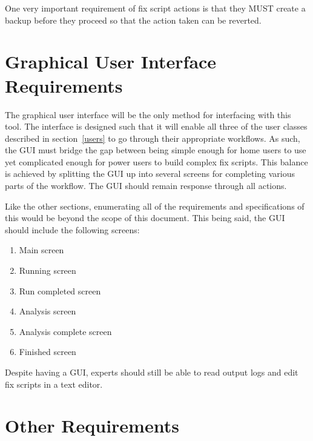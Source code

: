 \documentclass[letterpaper,12pt]{article}
\begin{document}
One very important requirement of fix script actions is that they MUST create a
backup before they proceed so that the action taken can be reverted.  

\newpage



\section{Graphical User Interface Requirements} \label{gui}
The graphical user interface will be the only method for interfacing with this
tool.  The interface is designed such that it will enable all three of the user
classes described in section~\ref{users} to go through their appropriate
workflows.  As such, the GUI must bridge the gap between being simple enough for
home users to use yet complicated enough for power users to build complex fix
scripts.  This balance is achieved by splitting the GUI up into several screens
for completing various parts of the workflow.  The GUI should remain response
through all actions. 

Like the other sections, enumerating all of the requirements and specifications
of this would be beyond the scope of this document.  This being said, the GUI
should include the following screens:

\begin{enumerate}
  \item Main screen
  \item Running screen
  \item Run completed screen
  \item Analysis screen
  \item Analysis complete screen
  \item Finished screen
\end{enumerate}

Despite having a GUI, experts should still be able to read output logs and edit
fix scripts in a text editor.  

\newpage



\section{Other Requirements}
\end{document}
